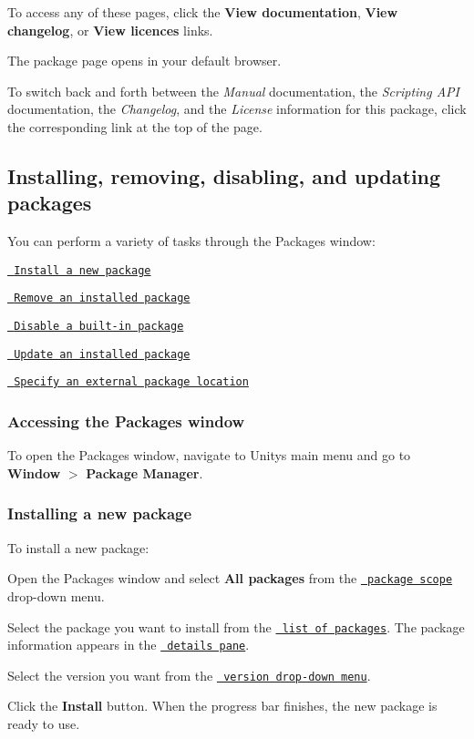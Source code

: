 To access any of these pages, click the {\bfseries{View documentation}}, {\bfseries{View changelog}}, or {\bfseries{View licences}} links.

The package page opens in your default browser.



To switch back and forth between the {\itshape Manual} documentation, the {\itshape Scripting A\+PI} documentation, the {\itshape Changelog}, and the {\itshape License} information for this package, click the corresponding link at the top of the page.

\label{_PackManOpen}%
 \subsection*{Installing, removing, disabling, and updating packages}

You can perform a variety of tasks through the Packages window\+:


\begin{DoxyItemize}
\item \href{\#PackManInstall}{\texttt{ Install a new package}}
\item \href{\#PackManRemove}{\texttt{ Remove an installed package}}
\item \href{\#PackManDisable}{\texttt{ Disable a built-\/in package}}
\item \href{\#PackManUpdate}{\texttt{ Update an installed package}}
\item \href{\#extpkg}{\texttt{ Specify an external package location}}
\end{DoxyItemize}

\subsubsection*{Accessing the Packages window}

To open the Packages window, navigate to Unity\textquotesingle{}s main menu and go to {\bfseries{Window}} $>$ {\bfseries{Package Manager}}.

\label{_PackManInstall}%
 \subsubsection*{Installing a new package}

To install a new package\+:


\begin{DoxyEnumerate}
\item Open the Packages window and select {\bfseries{All packages}} from the \href{\#scope}{\texttt{ package scope}} drop-\/down menu.
\item Select the package you want to install from the \href{\#PackManLists}{\texttt{ list of packages}}. The package information appears in the \href{\#PackManDetails}{\texttt{ details pane}}.
\item Select the version you want from the \href{\#VersionList}{\texttt{ version drop-\/down menu}}.
\item Click the {\bfseries{Install}} button. When the progress bar finishes, the new package is ready to use.
\end{DoxyEnumerate}

